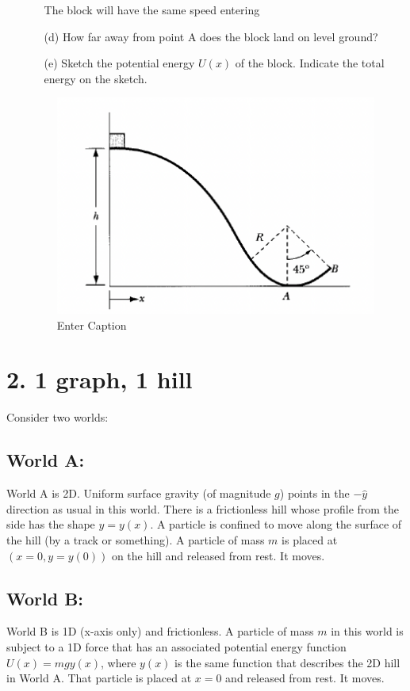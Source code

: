 \documentclass[12pt]{article}
\begin{document}
\begin{itemize}
\begin{enumerate}
    The block will have the same speed entering
    
    \item[(d)] How far away from point A does the block land on level ground?
    \item[(e)] Sketch the potential energy $U(x)$ of the block. Indicate the total energy on the sketch.
\end{enumerate}

\begin{figure}[!h]
    \centering
    \includegraphics[width=0.5\linewidth]{Pictures//PS02/MT5-2-25.png}
    \caption{Enter Caption}
    \label{fig:MT2-25}
\end{figure}

\end{itemize}

\section*{2. 1 graph, 1 hill}

Consider two worlds:

\subsection*{World A:}
World A is 2D. Uniform surface gravity (of magnitude \(g\)) points in the \(-\hat{y}\) direction as usual in this world. There is a frictionless hill whose profile from the side has the shape \(y = y(x)\). A particle is confined to move along the surface of the hill (by a track or something). A particle of mass \(m\) is placed at \((x = 0, y = y(0))\) on the hill and released from rest. It moves.

\subsection*{World B:}
World B is 1D (x-axis only) and frictionless. A particle of mass \(m\) in this world is subject to a 1D force that has an associated potential energy function \(U(x) = mgy(x)\), where \(y(x)\) is the same function that describes the 2D hill in World A. That particle is placed at \(x = 0\) and released from rest. It moves.
\end{document}
